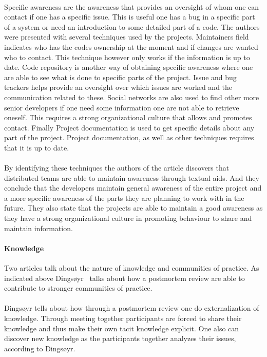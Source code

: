 \documentclass{article}
\begin{document}
\paragraph{}Specific awareness are the awareness that provides an oversight of whom one can contact if one has a specific issue. This is useful one has a bug in a specific part of a system or need an introduction to some detailed part of a code. The authors were presented with several techniques used by the projects. Maintainers field indicates who has the codes ownership at the moment and if changes are wanted who to contact. This technique however only works if the information is up to date. Code repository is another way of obtaining specific awareness where one are able to see what is done to specific parts of the project. Issue and bug trackers helps provide an oversight over which issues are worked and the communication related to these. Social networks are also used to find other more senior developers if one need some information one are not able to retrieve oneself. This requires a strong organizational culture that allows and promotes contact. Finally Project documentation is used to get specific details about any part of the project. Project documentation, as well as other techniques requires that it is up to date. 

\paragraph{}By identifying these techniques the authors of the article discovers that distributed teams are able to maintain awareness through textual aids. And they conclude that the developers maintain general awareness of the entire project and a more specific awareness of the parts they are planning to work with in the future. They also state that the projects are able to maintain a good awareness as they have a strong organizational culture in promoting behaviour to share and maintain information. 

\paragraph{Knowledge}
Two articles talk about the nature of knowledge and communities of practice. As indicated above Dingsøyr~\cite{Dingsoyr} talks about how a postmortem review are able to contribute to stronger communities of practice. 

\paragraph{}Dingsøyr tells about how through a postmortem review one do externalization of knowledge. Through meeting together participants are forced to share their knowledge and thus make their own tacit knowledge explicit. One also can discover new knowledge as the participants together analyzes their issues, according to Dingsøyr.
\end{document}
